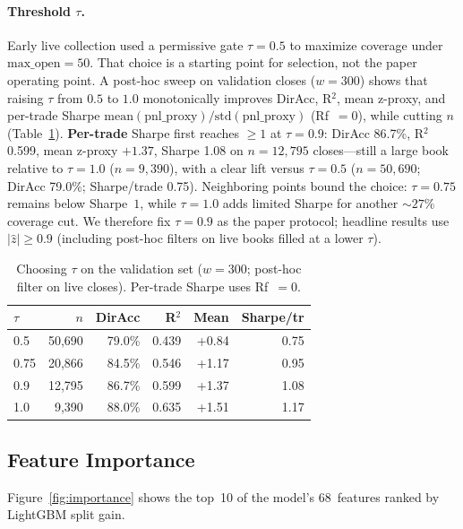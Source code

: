\paragraph{Threshold $\tau$.}
Early live collection used a permissive gate $\tau{=}0.5$ to maximize coverage under $\text{max\_open}{=}50$. That choice is a starting point for selection, not the paper operating point. A post-hoc sweep on validation closes ($w{=}300$) shows that raising $\tau$ from $0.5$ to $1.0$ monotonically improves DirAcc, R$^2$, mean z-proxy, and per-trade Sharpe $\mathrm{mean}(\mathrm{pnl\_proxy})/\mathrm{std}(\mathrm{pnl\_proxy})$ (Rf~$=0$), while cutting $n$ (Table~\ref{tab:tau_sensitivity}). \textbf{Per-trade} Sharpe first reaches ${\geq}1$ at $\tau{=}0.9$: DirAcc 86.7\%, R$^2$ 0.599, mean z-proxy $+1.37$, Sharpe 1.08 on $n{=}12{,}795$ closes---still a large book relative to $\tau{=}1.0$ ($n{=}9{,}390$), with a clear lift versus $\tau{=}0.5$ ($n{=}50{,}690$; DirAcc 79.0\%; Sharpe/trade 0.75). Neighboring points bound the choice: $\tau{=}0.75$ remains below Sharpe~$1$, while $\tau{=}1.0$ adds limited Sharpe for another ${\sim}27\%$ coverage cut. We therefore fix $\tau{=}0.9$ as the paper protocol; headline results use $|\hat{z}|\geq 0.9$ (including post-hoc filters on live books filled at a lower $\tau$).

\begin{table}[h]
\caption{Choosing $\tau$ on the validation set ($w{=}300$; post-hoc filter on live closes). Per-trade Sharpe uses Rf~$=0$.}
\label{tab:tau_sensitivity}
\small
\begin{tabular}{lrrrrr}
\toprule
$\tau$ & $n$ & \textbf{DirAcc} & \textbf{R$^2$} & \textbf{Mean} & \textbf{Sharpe/tr} \\
\midrule
0.5 & 50{,}690 & 79.0\% & 0.439 & +0.84 & 0.75 \\
0.75 & 20{,}866 & 84.5\% & 0.546 & +1.17 & 0.95 \\
0.9 & 12{,}795 & 86.7\% & 0.599 & +1.37 & 1.08 \\
1.0 & 9{,}390 & 88.0\% & 0.635 & +1.51 & 1.17 \\
\bottomrule
\end{tabular}
\end{table}

\subsection{Feature Importance}

Figure~\ref{fig:importance} shows the top~10 of the model's 68~features ranked by LightGBM split gain.

